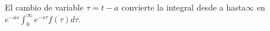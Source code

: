 El cambio de variable \(\tau=t-a\) convierte la integral desde a hasta\ensuremath{\infty} en \(e^{-as}\int_0^\infty e^{-s\tau}f(\tau)d\tau\).
